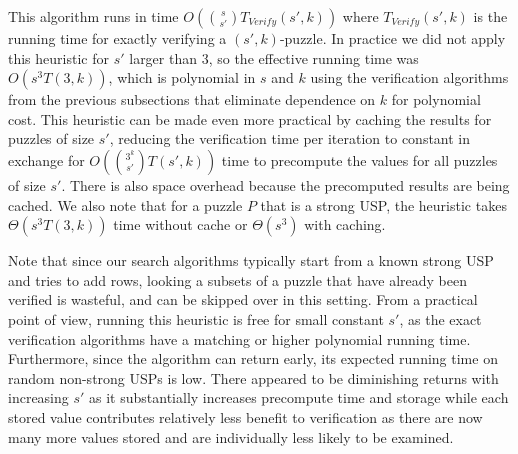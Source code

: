 \documentclass[11pt]{article}
\begin{document}
This algorithm runs in time $O(\binom{s}{s'} T_{Verify}(s', k))$ where
$T_{Verify}(s',k)$ is the running time for exactly verifying a
$(s',k)$-puzzle.  In practice we did not apply this heuristic for $s'$
larger than $3$, so the effective running time was $O(s^3 T(3,k))$,
which is polynomial in $s$ and $k$ using the verification algorithms
from the previous subsections that eliminate dependence on $k$ for
polynomial cost.  This heuristic can be made even more practical by
caching the results for puzzles of size $s'$, reducing the
verification time per iteration to constant in exchange for
$O(\binom{3^k}{s'}T(s',k))$ time to precompute the values for all
puzzles of size $s'$.  There is also space overhead because the
precomputed results are being cached.  We also note that for a puzzle
$P$ that is a strong USP, the heuristic takes $\Theta(s^3 T(3,k))$
time without cache or $\Theta(s^3)$ with caching.

Note that since our search algorithms typically start from a known
strong USP and tries to add rows, looking a subsets of a puzzle that
have already been verified is wasteful, and can be skipped over in
this setting.  From a practical point of view, running this heuristic
is free for small constant $s'$, as the exact verification algorithms
have a matching or higher polynomial running time.  Furthermore, since
the algorithm can return early, its expected running time on random
non-strong USPs is low.  There appeared to be diminishing returns with
increasing $s'$ as it substantially increases precompute time and
storage while each stored value contributes relatively less benefit to
verification as there are now many more values stored and are
individually less likely to be examined.



\end{document}
